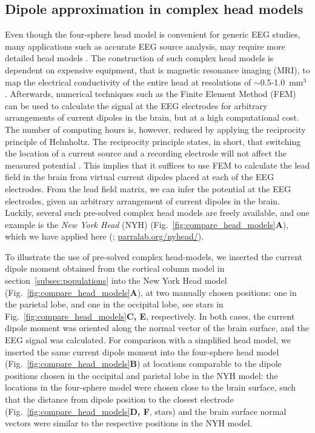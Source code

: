 \documentclass[preprint,10pt,authoryear]{elsarticle}
\begin{document}
\subsection{Dipole approximation in complex head models}

Even though the four-sphere head model is convenient for generic EEG studies, many applications such as accurate EEG source analysis, may require more detailed head models \citep{DALE1999, VORWERK2014}.
The construction of such complex head models is dependent on expensive equipment, 
that is magnetic resonance imaging (MRI), to map the electrical conductivity of the entire head at resolutions of $\sim$0.5-1.0~mm$^3$
\citep{HUANG2015, HUANG2016}. Afterwards, numerical techniques such as the Finite Element Method (FEM) \citep{LOGG2012} can be used to calculate the signal at the EEG electrodes for arbitrary arrangements of current dipoles in the brain, but at a high computational cost.
The number of computing hours is, however, reduced by applying the reciprocity principle of Helmholtz. The reciprocity principle states, in short, that switching the location of a current source and a recording electrode will not affect the measured potential \citep{Malmivuo1995, Ziegler2014, HUANG2016, Dmochowski2017}. 
This implies that it suffices to use FEM to calculate the lead field in the brain from virtual current dipoles placed at each of the EEG electrodes. From the lead field matrix, we can infer the potential at the EEG electrodes, given an arbitrary arrangement of current dipoles in the brain.
Luckily, several such pre-solved complex head models are freely available, and one example is the {\it New York Head} (NYH) (Fig.~\ref{fig:compare_head_models}\textbf{A}), which we have applied here (\cite{HUANG2016}; \href{https://parralab.org/nyhead/}{parralab.org/nyhead/}).

To illustrate the use of pre-solved complex head-models, we inserted the current dipole moment obtained from the cortical column model in section~\ref{subsec:populations} into the New York Head model (Fig.~\ref{fig:compare_head_models}\textbf{A}), at two manually chosen positions: one in the parietal lobe, and one in the occipital lobe, see stars in Fig.~\ref{fig:compare_head_models}\textbf{C, E}, respectively.
	In both cases, the current dipole moment was oriented along the normal vector of the brain surface, and the EEG signal was calculated.
For comparison with a simplified head model, we inserted the same current dipole moment into the four-sphere head model  (Fig.~\ref{fig:compare_head_models}\textbf{B}) at locations comparable to the dipole positions chosen in the occipital and parietal lobe in the NYH model: the locations in the four-sphere model were chosen close to the brain surface, such that the distance from dipole position to the closest electrode (Fig.~\ref{fig:compare_head_models}\textbf{D, F}, stars) and the brain surface normal vectors were similar to the respective positions in the NYH model.
\end{document}
